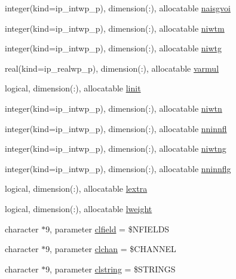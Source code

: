 \begin{DoxyCompactItemize}
integer(kind=ip\+\_\+intwp\+\_\+p), dimension(\+:), allocatable \hyperlink{namespacemod__oasis__namcouple_a87c0bb7c0a2cccbb673dcaf35e3dec50}{naisgvoi}
\item 
integer(kind=ip\+\_\+intwp\+\_\+p), dimension(\+:), allocatable \hyperlink{namespacemod__oasis__namcouple_a90e4ce86f77bf89c71a9277ff9b5dcbb}{niwtm}
\item 
integer(kind=ip\+\_\+intwp\+\_\+p), dimension(\+:), allocatable \hyperlink{namespacemod__oasis__namcouple_a28e887d61cc4b10c00c33a7d0f51a275}{niwtg}
\item 
real(kind=ip\+\_\+realwp\+\_\+p), dimension(\+:), allocatable \hyperlink{namespacemod__oasis__namcouple_ab7c38fd6bd90bb8e6ebfb539ead1f1a9}{varmul}
\item 
logical, dimension(\+:), allocatable \hyperlink{namespacemod__oasis__namcouple_ac124af3aecadc7ba436f2ee6caffee9a}{linit}
\item 
integer(kind=ip\+\_\+intwp\+\_\+p), dimension(\+:), allocatable \hyperlink{namespacemod__oasis__namcouple_a63c2f2977f9cc4839f6bdec7bbbc5fa7}{niwtn}
\item 
integer(kind=ip\+\_\+intwp\+\_\+p), dimension(\+:), allocatable \hyperlink{namespacemod__oasis__namcouple_a579387e570e26f2d6c6c2159824cf8a3}{nninnfl}
\item 
integer(kind=ip\+\_\+intwp\+\_\+p), dimension(\+:), allocatable \hyperlink{namespacemod__oasis__namcouple_a3379333e7d0f24b776c81b1087f3a3b4}{niwtng}
\item 
integer(kind=ip\+\_\+intwp\+\_\+p), dimension(\+:), allocatable \hyperlink{namespacemod__oasis__namcouple_a6526a92cd5fa662f9da229806d062dc2}{nninnflg}
\item 
logical, dimension(\+:), allocatable \hyperlink{namespacemod__oasis__namcouple_a2febd0d97dea9ecc3ce4a8c5088a8d1f}{lextra}
\item 
logical, dimension(\+:), allocatable \hyperlink{namespacemod__oasis__namcouple_a8d88d0c1b22ea43a9429f9e3a653a64b}{lweight}
\item 
character $\ast$9, parameter \hyperlink{namespacemod__oasis__namcouple_a1c3afcba25a8ba41738104d42a59e423}{clfield} = \textquotesingle{}\$N\+F\+I\+E\+L\+DS \textquotesingle{}
\item 
character $\ast$9, parameter \hyperlink{namespacemod__oasis__namcouple_ac0ead9ca992504e9b580db2678926b68}{clchan} = \textquotesingle{}\$C\+H\+A\+N\+N\+EL \textquotesingle{}
\item 
character $\ast$9, parameter \hyperlink{namespacemod__oasis__namcouple_a4dde076bf8cce410eebbd878f791e32e}{clstring} = \textquotesingle{}\$S\+T\+R\+I\+N\+GS \textquotesingle{}

\end{DoxyCompactItemize}
